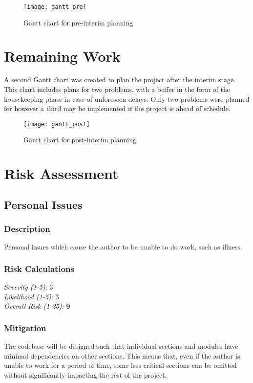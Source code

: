 \begin{figure}[h]
	\centering
	\texttt{[image: gantt\_pre]}
	\label{fig_g_pre}
	\caption{Gantt chart for pre-interim planning}
\end{figure}



\section{Remaining Work}
A second Gantt chart was created to plan the project after the interim stage. This chart includes plans for two problems, with a buffer in the form of the housekeeping phase in case of unforeseen delays. Only two problems were planned for however a third may be implemented if the project is ahead of schedule.

\begin{figure}[h]
	\centering
	\texttt{[image: gantt\_post]}
	\label{fig_g_post}
	\caption{Gantt chart for post-interim planning}
\end{figure}


\section{Risk Assessment}
\subsection{Personal Issues}

\subsubsection{Description}
Personal issues which cause the author to be unable to do work, such as illness.

\subsubsection{Risk Calculations}
\emph{Severity (1-5):} 3 \\
\emph{Likelihood (1-5):} 3 \\
\emph{Overall Risk (1-25):} \textbf{9}

\subsubsection{Mitigation}
The codebase will be designed such that individual sections and modules have minimal dependencies on other sections. This means that, even if the author is unable to work for a period of time, some less critical sections can be omitted without significantly impacting the rest of the project.

